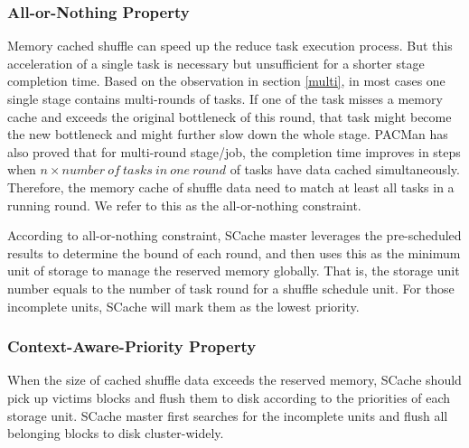 \subsubsection{All-or-Nothing Property}
Memory cached shuffle can speed up the reduce task execution process. But this acceleration of a single task is necessary but unsufficient for a shorter stage completion time. Based on the observation in section \ref{multi}, in most cases one single stage contains multi-rounds of tasks. If one of the task misses a memory cache and exceeds the original bottleneck of this round, that task might become the new bottleneck and might further slow down the whole stage. PACMan \cite{pacman} has also proved that for multi-round stage/job, the completion time improves in steps when $n\times number\ of\ tasks\ in\ one\ round$ of tasks have data cached simultaneously. Therefore, the memory cache of shuffle data need to match at least all tasks in a running round. We refer to this as the all-or-nothing constraint.

According to all-or-nothing constraint, SCache master leverages the pre-scheduled results to determine the bound of each round, and then uses this as the minimum unit of storage to manage the reserved memory globally.
That is, the storage unit number equals to the number of task round for a shuffle schedule unit.
For those incomplete units, SCache will mark them as the lowest priority.

\subsubsection{Context-Aware-Priority Property}
When the size of cached shuffle data exceeds the reserved memory, SCache should pick up victims blocks and flush them to disk according to the priorities of each storage unit. SCache master first searches for the incomplete units and flush all belonging blocks to disk cluster-widely.

